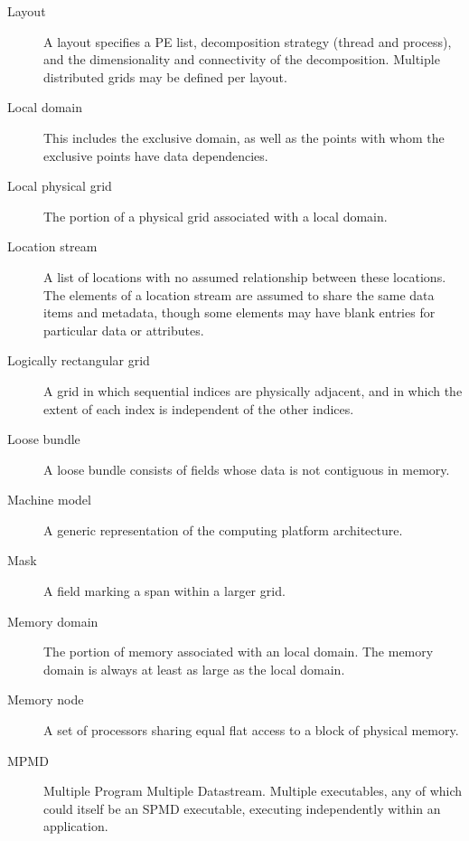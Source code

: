 \begin{description}
\item[Layout] \label{glos:Layout} A layout specifies a PE list, 
  decomposition strategy (thread and process), and the dimensionality 
  and connectivity of the decomposition.  Multiple distributed 
  grids may be defined per layout.

\item[Local domain] \label{glos:LocalDomain} This includes the exclusive 
  domain, as well as the points with whom the exclusive points have data 
  dependencies.

\item[Local physical grid] \label{glos:LocPhysGrid} The portion of a 
  physical grid associated with a local domain.  

\item[Location stream] \label{glos:LocStream} A list of
  locations with no assumed relationship between these locations.  The
  elements of a location stream are assumed to share the same data
  items and metadata, though some elements may have blank entries for
  particular data or attributes.

\item[Logically rectangular grid] \label{glos:RecGrid} A grid in 
  which sequential indices are physically adjacent, and in which the 
  extent of each index is independent of the other indices.

\item[Loose bundle] \label{glos:LooseBundle} A loose bundle consists of 
  fields whose data is not contiguous in memory.

\item[Machine model] A generic representation of the computing 
  platform architecture.

\item[Mask] \label{glos:Mask} A field marking a span within a larger grid.

\item[Memory domain] \label{glos:MemDomain} The portion of memory 
  associated with an local domain.  The memory domain is always at least 
  as large as the local domain.

\item[Memory node] \label{glos:Mnode} A set of processors
  sharing equal flat access to a block of physical memory.

\item[MPMD] \label{glos:MPMD} Multiple Program Multiple Datastream.
  Multiple executables, any of which could itself be an SPMD
  executable, executing independently within an application.


\end{description}
